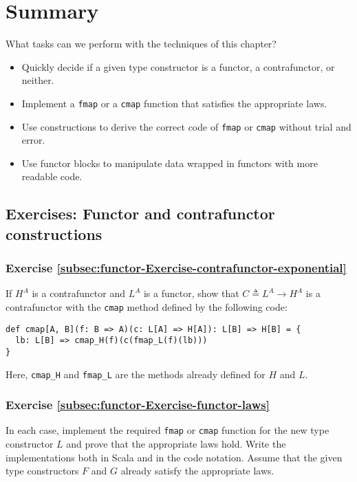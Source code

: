 \section{Summary}

What tasks can we perform with the techniques of this chapter?
\begin{itemize}
\item Quickly decide if a given type constructor is a functor, a contrafunctor,
or neither.
\item Implement a \lstinline!fmap! or a \lstinline!cmap! function that
satisfies the appropriate laws.
\item Use constructions to derive the correct code of \lstinline!fmap!
or \lstinline!cmap! without trial and error.
\item Use functor blocks to manipulate data wrapped in functors with more
readable code.
\end{itemize}

\subsection{Exercises: Functor and contrafunctor constructions }

\subsubsection{Exercise \label{subsec:functor-Exercise-contrafunctor-exponential}\ref{subsec:functor-Exercise-contrafunctor-exponential}}

If $H^{A}$ is a contrafunctor and $L^{A}$ is a functor, show that
$C\triangleq L^{A}\rightarrow H^{A}$ is a contrafunctor with the
\lstinline!cmap! method defined by the following code:
\begin{lstlisting}
def cmap[A, B](f: B => A)(c: L[A] => H[A]): L[B] => H[B] = {
  lb: L[B] => cmap_H(f)(c(fmap_L(f)(lb)))
}
\end{lstlisting}
Here, \lstinline!cmap_H! and \lstinline!fmap_L! are the methods
already defined for $H$ and $L$.

\subsubsection{Exercise \label{subsec:functor-Exercise-functor-laws}\ref{subsec:functor-Exercise-functor-laws}}

In each case, implement the required \lstinline!fmap! or \lstinline!cmap!
function for the new type constructor $L$ and prove that the appropriate
laws hold. Write the implementations both in Scala and in the code
notation. Assume that the given type constructors $F$ and $G$ already
satisfy the appropriate laws.

